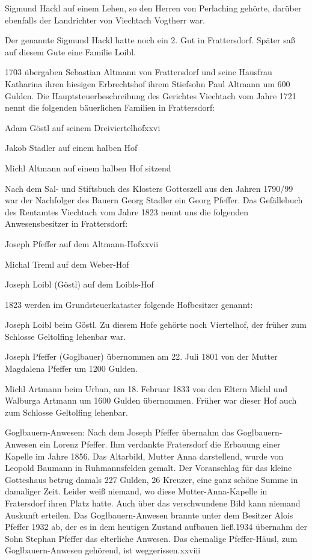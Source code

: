 \documentclass[12pt,a4pager]{book}
\begin{document}
Sigmund Hackl auf einem Lehen, so den Herren von Perlaching gehörte, darüber
ebenfalls der Landrichter von Viechtach Vogtherr war.

Der genannte Sigmund Hackl hatte noch ein 2. Gut in Frattersdorf. Später saß auf
diesem Gute eine Familie Loibl.

1703 übergaben Sebastian Altmann von Frattersdorf und seine Hausfrau Katharina
ihren hiesigen Erbrechtshof ihrem Stiefsohn Paul Altmann um 600 Gulden. Die
Hauptsteuerbeschreibung des Gerichtes Viechtach vom Jahre 1721 nennt die
folgenden bäuerlichen Familien in Frattersdorf:

Adam Göstl auf seinem Dreiviertelhofxxvi

Jakob Stadler auf einem halben Hof

Michl Altmann auf einem halben Hof sitzend

Nach dem Sal- und Stiftsbuch des Klosters Gotteszell aus den Jahren 1790/99 war
der Nachfolger des Bauern Georg Stadler ein Georg Pfeffer. Das Gefällebuch des
Rentamtes Viechtach vom Jahre 1823 nennt uns die folgenden Anwesensbesitzer in
Frattersdorf:

Joseph Pfeffer auf dem Altmann-Hofxxvii

Michal Treml auf dem Weber-Hof

Joseph Loibl (Göstl) auf dem Loibls-Hof

1823 werden im Grundsteuerkataster folgende Hofbesitzer genannt:

Joseph Loibl beim Göstl. Zu diesem Hofe gehörte noch Viertelhof, der früher zum
Schlosse Geltolfing lehenbar war.

Joseph Pfeffer (Goglbauer) übernommen am 22. Juli 1801 von der Mutter Magdalena
Pfeffer um 1200 Gulden.

Michl Artmann beim Urban, am 18. Februar 1833 von den Eltern Michl und Walburga
Artmann um 1600 Gulden übernommen. Früher war dieser Hof auch zum Schlosse
Geltolfing lehenbar.

Goglbauern-Anwesen: Nach dem Joseph Pfeffer übernahm das Goglbauern-Anwesen ein
Lorenz Pfeffer. Ihm verdankte Fratersdorf die Erbauung einer Kapelle im Jahre
1856. Das Altarbild, Mutter Anna darstellend, wurde von Leopold Baumann in
Ruhmannsfelden gemalt. Der Voranschlag für das kleine Gotteshaus betrug damals
227 Gulden, 26 Kreuzer, eine ganz schöne Summe in damaliger Zeit. Leider weiß
niemand, wo diese Mutter-Anna-Kapelle in Fratersdorf ihren Platz hatte. Auch
über das verschwundene Bild kann niemand Auskunft erteilen. Das
Goglbauern-Anwesen brannte unter dem Besitzer Alois Pfeffer 1932 ab, der es in
dem heutigen Zustand aufbauen ließ.1934 übernahm der Sohn Stephan Pfeffer das
elterliche Anwesen. Das ehemalige Pfeffer-Häusl, zum Goglbauern-Anwesen
gehörend, ist weggerissen.xxviii
\end{document}
